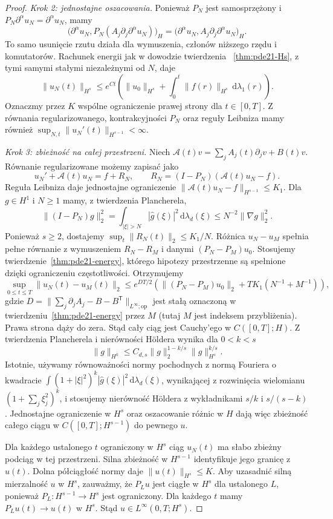 \begin{proof}
\emph{Krok 2: jednostajne oszacowania.}
Ponieważ $P_N$ jest samosprzężony i
$P_N\partial^\alpha u_N=\partial^\alpha u_N$,
mamy
\[
 \bigl(\partial^\alpha u_N,
 P_N(A_j\partial_j\partial^\alpha u_N)\bigr)_H
 =\bigl(\partial^\alpha u_N,
 A_j\partial_j\partial^\alpha u_N\bigr)_H.
\]
To samo usunięcie rzutu działa dla wymuszenia,
członów niższego rzędu i komutatorów.
Rachunek energii jak w dowodzie twierdzenia
~\ref{thm:pde21-Hs}, z tymi samymi stałymi niezależnymi
od $N$, daje
\[
 \|u_N(t)\|_{H^s}\le e^{Ct}
 \left(\|u_0\|_{H^s}+\int_0^t\|f(r)\|_{H^s}
 \,\mathrm d\lambda_1(r)\right).
\]
Oznaczmy przez $K$ wspólne ograniczenie prawej
strony dla $t\in[0,T]$. Z równania regularizowanego,
kontrakcyjności $P_N$ oraz reguły Leibniza mamy również
$\sup_{N,t}\|u_N'(t)\|_{H^{s-1}}<\infty$.

\emph{Krok 3: zbieżność na całej przestrzeni.}
Niech $\mathcal A(t)v=\sum_j A_j(t)\partial_jv+B(t)v$.
Równanie regularizowane możemy zapisać jako
\[
 u_N'+\mathcal A(t)u_N=f+R_N,\qquad
 R_N=(I-P_N)(\mathcal A(t)u_N-f).
\]
Reguła Leibniza daje jednostajne ograniczenie
$\|\mathcal A(t)u_N-f\|_{H^{s-1}}\le K_1$.
Dla $g\in H^1$ i $N\ge1$ mamy, z twierdzenia
Plancherela,
\[
 \|(I-P_N)g\|_2^2
 =\int_{|\xi|>N}|\widehat g(\xi)|^2\,\mathrm d\lambda_d(\xi)
 \le N^{-2}\|\nabla g\|_2^2.
\]
Ponieważ $s\ge2$, dostajemy
$\sup_t\|R_N(t)\|_2\le K_1/N$.
Różnica $u_N-u_M$ spełnia pełne równanie
z wymuszeniem $R_N-R_M$ i danymi $(P_N-P_M)u_0$.
Stosujemy twierdzenie~\ref{thm:pde21-energy},
którego hipotezy przestrzenne są spełnione
dzięki ograniczeniu częstotliwości. Otrzymujemy
\[
 \sup_{0\le t\le T}\|u_N(t)-u_M(t)\|_2
 \le e^{DT/2}
 \left(\|(P_N-P_M)u_0\|_2+TK_1(N^{-1}+M^{-1})\right),
\]
gdzie $D=\|\sum_j\partial_jA_j-B-B^\mathsf T
\|_{L^\infty;\mathrm{op}}$ jest stałą oznaczoną
w twierdzeniu~\ref{thm:pde21-energy} przez $M$
(tutaj $M$ jest indeksem przybliżenia).
Prawa strona dąży do zera.
Stąd cały ciąg jest Cauchy'ego w $C([0,T];H)$.
Z twierdzenia Plancherela i nierówności H\"oldera
wynika dla $0<k<s$
\[
 \|g\|_{H^k}\le C_{d,s}\|g\|_2^{1-k/s}
                                  \|g\|_{H^s}^{k/s}.
\]
Istotnie, używamy równoważności normy pochodnych
z normą Fouriera o kwadracie
$\int(1+|\xi|^2)^k|\widehat g(\xi)|^2
\,\mathrm d\lambda_d(\xi)$, wynikającej z rozwinięcia
wielomianu $(1+\sum_j\xi_j^2)^k$, i stosujemy
nierówność H\"oldera z wykładnikami $s/k$ i $s/(s-k)$.
Jednostajne ograniczenie w $H^s$ oraz oszacowanie
różnic w $H$ dają więc zbieżność całego ciągu
w $C([0,T];H^{s-1})$ do pewnego $u$.

Dla każdego ustalonego $t$ ograniczony w $H^s$
ciąg $u_N(t)$ ma słabo zbieżny podciąg w tej
przestrzeni. Silna zbieżność w $H^{s-1}$ identyfikuje
jego granicę z $u(t)$. Dolna półciągłość normy
daje $\|u(t)\|_{H^s}\le K$. Aby uzasadnić silną
mierzalność $u$ w $H^s$, zauważmy, że $P_Lu$
jest ciągłe w $H^s$ dla ustalonego $L$, ponieważ
$P_L:H^{s-1}\to H^s$ jest ograniczony.
Dla każdego $t$ mamy $P_Lu(t)\to u(t)$ w $H^s$.
Stąd $u\in L^\infty(0,T;H^s)$.


\end{proof}
